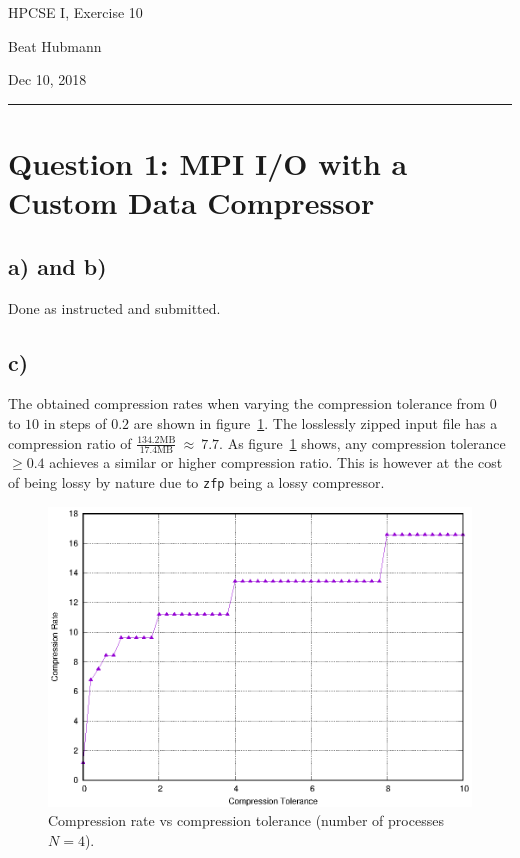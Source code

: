 \documentclass[11pt,a4paper]{article}
\begin{document}
\noindent\parbox{\linewidth}{
 \parbox{.25\linewidth}{ \large HPCSE I, Exercise 10 }\hfill
 \parbox{.5\linewidth}{\begin{center} \large Beat Hubmann \end{center}}\hfill
 \parbox{.2\linewidth}{\begin{flushright} \large Dec 10, 2018 \end{flushright}}
}
\noindent\rule{\linewidth}{2pt}

\section{Question 1: MPI I/O with a Custom Data Compressor}

\subsection{a) and b)}
Done as instructed and submitted.

\subsection{c)}
The obtained compression rates when varying the compression tolerance from $0$ to $10$ in steps of $0.2$
are shown in figure~\ref{fig:1}. The losslessly zipped input file has a compression ratio of $\frac{134.2\text{MB}}{17.4\text{MB}}\ \approx \ 7.7$.
As figure~\ref{fig:1} shows, any compression tolerance $\ge 0.4$ achieves a similar or higher compression ratio. This is however at
the cost of being lossy by nature due to \texttt{zfp} being a lossy compressor.

\begin{figure}[ht]
\begin{center}
\includegraphics[scale=1.0]{compare.eps} 
\end{center}
\caption{Compression rate vs compression tolerance (number of processes $N=4$).} 
\label{fig:1}
\end{figure}
\end{document}
